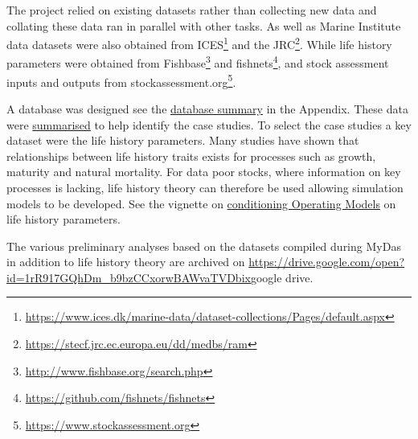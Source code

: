 The project relied on existing datasets rather than collecting new data and collating these data ran in parallel with other tasks. As well as Marine Institute data datasets were also obtained from ICES\footnote{\url{https://www.ices.dk/marine-data/dataset-collections/Pages/default.aspx}} and the JRC\footnote{\url{https://stecf.jrc.ec.europa.eu/dd/medbs/ram}}. While life history parameters were obtained from Fishbase\footnote{\url{http://www.fishbase.org/search.php}} and fishnets\footnote{\url{https://github.com/fishnets/fishnets}}, and stock assessment inputs and outputs from stockassessment.org\footnote{\url{https://www.stockassessment.org}}.

A database was designed see the \hyperref[appendix:db]{database summary} in the Appendix. These data were \href{https://3o2y9wugzp1kfxr5hvzgzq-on.drv.tw/MyDas/tasks/1/stockprioritisation.nb.html}{summarised} to help identify the case studies. To select the case studies a key dataset were the life history parameters. Many studies have shown that relationships between life history traits exists for processes such as growth, maturity and natural mortality. For data poor stocks, where information on key processes is lacking, life history theory can therefore be used allowing simulation models to be developed.  See the vignette on \href{https://3o2y9wugzp1kfxr5hvzgzq-on.drv.tw/MyDas/vignettes/conditioning.html}{conditioning Operating Models} on life history parameters. 

The various preliminary analyses based on the datasets compiled during MyDas in addition to life history theory are archived on \url{https://drive.google.com/open?id=1rR917GQhDm_b9bzCCxorwBAWvaTVDbix}{google drive}. %


